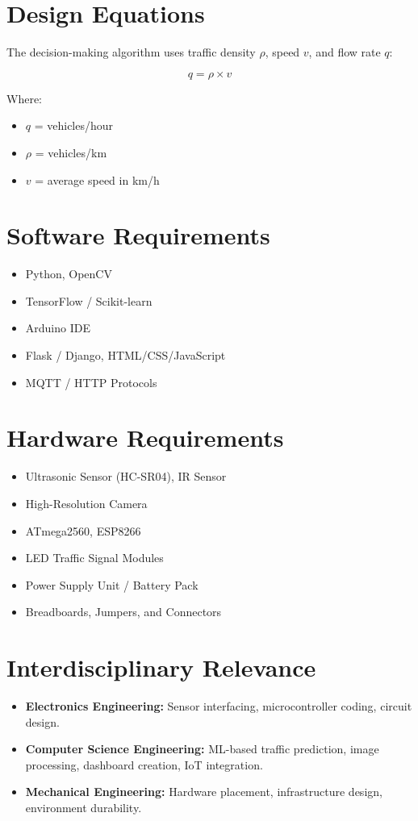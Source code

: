 \section{Design Equations}
The decision-making algorithm uses traffic density $\rho$, speed $v$, and flow rate $q$:

\begin{equation}
q = \rho \times v
\end{equation}

Where:
\begin{itemize}
\item $q$ = vehicles/hour
\item $\rho$ = vehicles/km
\item $v$ = average speed in km/h
\end{itemize}

\section{Software Requirements}
\begin{itemize}
\item Python, OpenCV
\item TensorFlow / Scikit-learn
\item Arduino IDE
\item Flask / Django, HTML/CSS/JavaScript
\item MQTT / HTTP Protocols
\end{itemize}

\section{Hardware Requirements}
\begin{itemize}
\item Ultrasonic Sensor (HC-SR04), IR Sensor
\item High-Resolution Camera
\item ATmega2560, ESP8266
\item LED Traffic Signal Modules
\item Power Supply Unit / Battery Pack
\item Breadboards, Jumpers, and Connectors
\end{itemize}

\section{Interdisciplinary Relevance}
\begin{itemize}
\item \textbf{Electronics Engineering:} Sensor interfacing, microcontroller coding, circuit design.
\item \textbf{Computer Science Engineering:} ML-based traffic prediction, image processing, dashboard creation, IoT integration.
\item \textbf{Mechanical Engineering:} Hardware placement, infrastructure design, environment durability.
\end{itemize}

